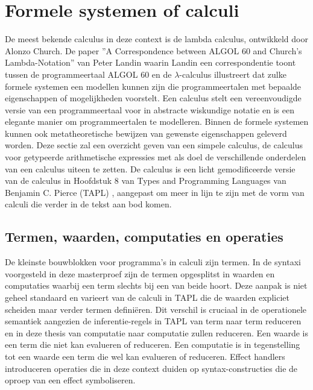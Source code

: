 \section{Formele systemen of calculi}
\label{subsec:formSysCal}
De meest bekende calculus in deze context is de lambda calculus, ontwikkeld door Alonzo Church\cite{Church1941}. De paper ''A Correspondence between ALGOL 60 and Church's Lambda-Notation'' van Peter Landin \cite{Landin1965} waarin Landin een correspondentie toont tussen de programmeertaal ALGOL 60 en de $\lambda$-calculus illustreert dat zulke formele systemen een modellen kunnen zijn die programmeertalen met bepaalde eigenschappen of mogelijkheden voorstelt. Een calculus stelt een vereenvoudigde versie van een programmeertaal voor in abstracte wiskundige notatie en is een elegante manier om programmeertalen te modelleren. Binnen de formele systemen kunnen ook metatheoretische bewijzen van gewenste eigenschappen geleverd worden. Deze sectie zal een overzicht geven van een simpele calculus, de calculus voor getypeerde arithmetische expressies met als doel de verschillende onderdelen van een calculus uiteen te zetten. De calculus is een licht gemodificeerde versie van de calculus in Hoofdstuk 8 van Types and Programming Languages van Benjamin C. Pierce (TAPL) \cite{Pierce2002}, aangepast om meer in lijn te zijn met de vorm van calculi die verder in de tekst aan bod komen.

\subsection{Termen, waarden, computaties en operaties}
\label{subsec:termWaaComOp}
De kleinste bouwblokken voor programma's in calculi zijn termen. In de syntaxi voorgesteld in deze masterproef zijn de termen opgesplitst in waarden en computaties waarbij een term slechts bij een van beide hoort. Deze aanpak is niet geheel standaard en varieert van de calculi in TAPL die de waarden expliciet scheiden maar verder termen definiëren. Dit verschil is cruciaal in de operationele semantiek aangezien de inferentie-regels in TAPL van term naar term reduceren en in deze thesis van computatie naar computatie zullen reduceren. Een waarde is een term die niet kan evalueren of reduceren. Een computatie is in tegenstelling tot een waarde een term die wel kan evalueren of reduceren. Effect handlers introduceren operaties die in deze context duiden op syntax-constructies die de oproep van een effect symboliseren.

